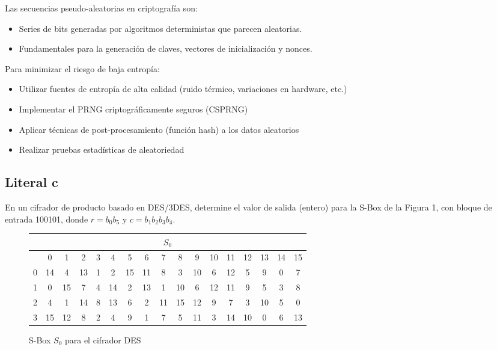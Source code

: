 {Las secuencias pseudo-aleatorias en criptografía son:
\begin{itemize}
    \item Series de bits generadas por algoritmos deterministas que parecen aleatorias.
    \item Fundamentales para la generación de claves, vectores de inicialización y nonces.
\end{itemize}

Para minimizar el riesgo de baja entropía:
\begin{itemize}
    \item Utilizar fuentes de entropía de alta calidad (ruido térmico, variaciones en hardware, etc.)
    \item Implementar el PRNG criptográficamente seguros (CSPRNG)
    \item Aplicar técnicas de post-procesamiento (función hash) a los datos aleatorios
    \item Realizar pruebas estadísticas de aleatoriedad
\end{itemize}




\subsection{Literal c}
En un cifrador de producto basado en DES/3DES, determine el valor de salida (entero) para la S-Box de la Figura 1, con bloque de entrada 100101, donde $r = b_0b_5$ y $c = b_1b_2b_3b_4$.

\begin{figure}[h]
\centering
\begin{tabular}{|c|c|c|c|c|c|c|c|c|c|c|c|c|c|c|c|c|}
\hline
\multicolumn{17}{|c|}{$S_0$} \\
\hline
& 0 & 1 & 2 & 3 & 4 & 5 & 6 & 7 & 8 & 9 & 10 & 11 & 12 & 13 & 14 & 15 \\
\hline
0 & 14 & 4 & 13 & 1 & 2 & 15 & 11 & 8 & 3 & 10 & 6 & 12 & 5 & 9 & 0 & 7 \\
\hline
1 & 0 & 15 & 7 & 4 & 14 & 2 & 13 & 1 & 10 & 6 & 12 & 11 & 9 & 5 & 3 & 8 \\
\hline
2 & 4 & 1 & 14 & 8 & 13 & 6 & 2 & 11 & 15 & 12 & 9 & 7 & 3 & 10 & 5 & 0 \\
\hline
3 & 15 & 12 & 8 & 2 & 4 & 9 & 1 & 7 & 5 & 11 & 3 & 14 & 10 & 0 & 6 & 13 \\
\hline
\end{tabular}
\caption{S-Box $S_0$ para el cifrador DES}
\end{figure}

}
